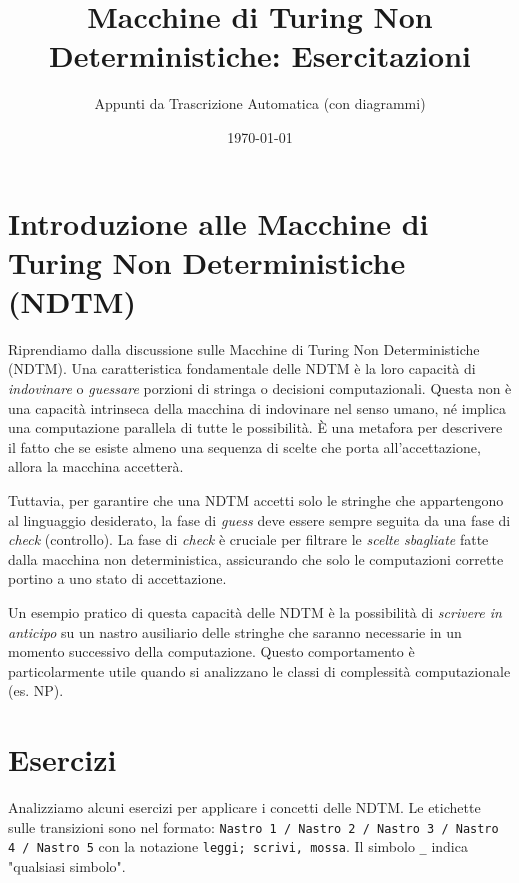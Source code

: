 \documentclass[a4paper]{article}
\title{Macchine di Turing Non Deterministiche: Esercitazioni}
\author{Appunti da Trascrizione Automatica (con diagrammi)}
\date{\today}
\begin{document}


\maketitle
\tableofcontents
\newpage

\section{Introduzione alle Macchine di Turing Non Deterministiche (NDTM)}

Riprendiamo dalla discussione sulle Macchine di Turing Non Deterministiche (NDTM).
Una caratteristica fondamentale delle NDTM è la loro capacità di \textit{indovinare} o \textit{guessare} porzioni di stringa o decisioni computazionali. Questa non è una capacità intrinseca della macchina di indovinare nel senso umano, né implica una computazione parallela di tutte le possibilità. È una metafora per descrivere il fatto che se esiste almeno una sequenza di scelte che porta all'accettazione, allora la macchina accetterà.

Tuttavia, per garantire che una NDTM accetti solo le stringhe che appartengono al linguaggio desiderato, la fase di \textit{guess} deve essere sempre seguita da una fase di \textit{check} (controllo). La fase di \textit{check} è cruciale per filtrare le \textit{scelte sbagliate} fatte dalla macchina non deterministica, assicurando che solo le computazioni corrette portino a uno stato di accettazione.

Un esempio pratico di questa capacità delle NDTM è la possibilità di \textit{scrivere in anticipo} su un nastro ausiliario delle stringhe che saranno necessarie in un momento successivo della computazione. Questo comportamento è particolarmente utile quando si analizzano le classi di complessità computazionale (es. NP).

\section{Esercizi}

Analizziamo alcuni esercizi per applicare i concetti delle NDTM. Le etichette sulle transizioni sono nel formato:
\texttt{Nastro 1 / Nastro 2 / Nastro 3 / Nastro 4 / Nastro 5}
con la notazione \texttt{leggi; scrivi, mossa}. Il simbolo \texttt{\_} indica "qualsiasi simbolo".
\end{document}
